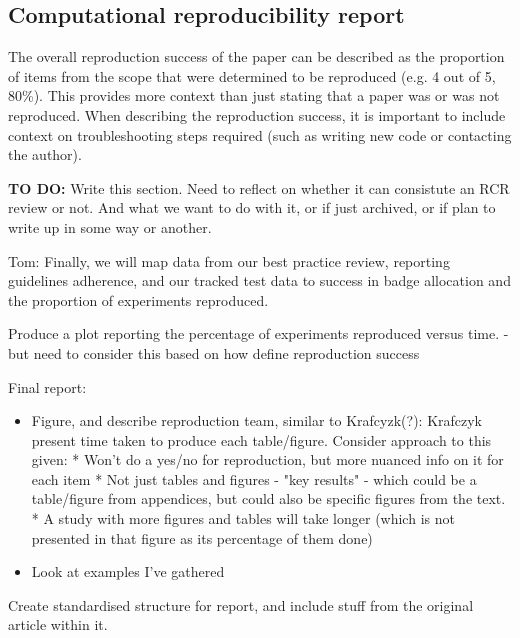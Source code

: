 \subsection{Computational reproducibility report} \label{sec:report}

The overall reproduction success of the paper can be described as the proportion of items from the scope that were determined to be reproduced (e.g. 4 out of 5, 80\%). This provides more context than just stating that a paper was or was not reproduced. When describing the reproduction success, it is important to include context on troubleshooting steps required (such as writing new code or contacting the author).


\textbf{TO DO:} Write this section. Need to reflect on whether it can consistute an RCR review or not. And what we want to do with it, or if just archived, or if plan to write up in some way or another.

Tom: Finally, we will map data from our best practice review, reporting guidelines adherence, and our tracked test data to success in badge allocation and the proportion of experiments reproduced.

Produce a plot reporting the percentage of experiments reproduced versus time. - but need to consider this based on how define reproduction success

Final report:
\begin{itemize}
    \item Figure, and describe reproduction team, similar to Krafcyzk(?):\autocite{krafczyk_learning_2021} Krafczyk present time taken to produce each table/figure. Consider approach to this given: * Won't do a yes/no for reproduction, but more nuanced info on it for each item * Not just tables and figures - "key results" - which could be a table/figure from appendices, but could also be specific figures from the text. * A study with more figures and tables will take longer (which is not presented in that figure as its percentage of them done)
    \item Look at examples I've gathered
\end{itemize}

Create standardised structure for report, and include stuff from the original article within it.

